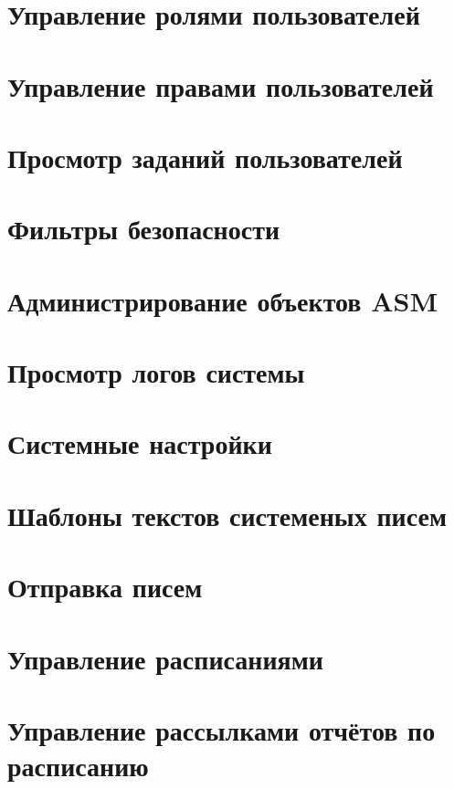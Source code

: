 \documentclass[../user-manual.tex]{subfiles}
\begin{document}
	
	\section{Управление ролями пользователей}	
	\section{Управление правами пользователей}
	\section{Просмотр заданий пользователей}
	\section{Фильтры безопасности}
	\section{Администрирование объектов ASM}\label{administration:ASM}
	\section{Просмотр логов системы}
	\section{Системные настройки}
	\section{Шаблоны текстов системеных писем}
	\section{Отправка писем}
	\section{Управление расписаниями}
	\section{Управление рассылками отчётов по расписанию}
	
\end{document}

